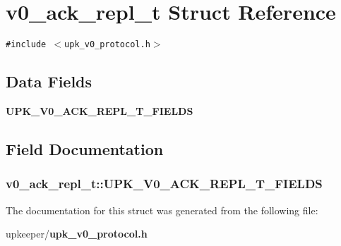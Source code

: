 \section{v0\_\-ack\_\-repl\_\-t Struct Reference}
\label{structv0__ack__repl__t}
{\tt \#include $<$upk\_\-v0\_\-protocol.h$>$}

\subsection*{Data Fields}
\begin{CompactItemize}
\item 
\bf{UPK\_\-V0\_\-ACK\_\-REPL\_\-T\_\-FIELDS}
\end{CompactItemize}


\subsection{Field Documentation}
\subsubsection{\setlength{\rightskip}{0pt plus 5cm}\bf{v0\_\-ack\_\-repl\_\-t::UPK\_\-V0\_\-ACK\_\-REPL\_\-T\_\-FIELDS}}\label{structv0__ack__repl__t_df00a427f75e13f44199946491f2547c}




The documentation for this struct was generated from the following file:\begin{CompactItemize}
\item 
upkeeper/\bf{upk\_\-v0\_\-protocol.h}\end{CompactItemize}
